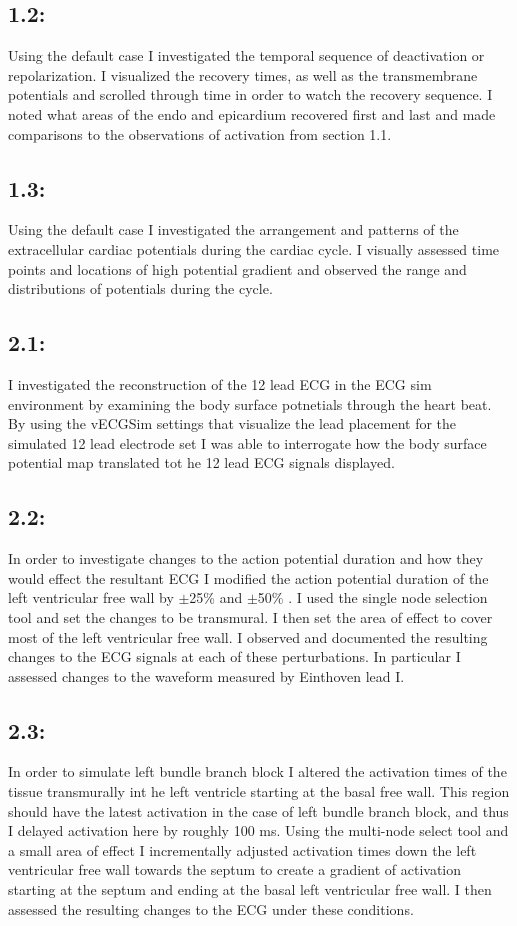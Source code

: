 \documentclass[12pt]{article}
\begin{document}
\subsection{1.2: }
Using the default case I investigated the temporal sequence of deactivation or repolarization. I visualized the recovery times, as well as the transmembrane potentials and scrolled through time in order to watch the recovery sequence. I noted what areas of the endo and epicardium recovered first and last and made comparisons to the observations of activation from section 1.1.
\subsection{1.3: }
Using the default case I investigated the arrangement and patterns of the extracellular cardiac potentials during the cardiac cycle. I visually assessed time points and locations of high potential gradient and observed the range and distributions of potentials during the cycle.

\subsection{2.1: }
I investigated the reconstruction of the 12 lead ECG in the ECG sim environment by examining the body surface potnetials through the heart beat. By using the vECGSim settings that visualize the lead placement for the simulated 12 lead electrode set I was able to interrogate how the body surface potential map translated tot he 12 lead ECG signals displayed.

\subsection{2.2: }
 In order to investigate changes to the action potential duration and how they would effect the resultant ECG I modified the action potential duration of the left ventricular free wall by $\pm$25\% and $\pm$50\% . I used the single node selection tool and set the changes to be transmural. I then set the area of effect to cover most of the left ventricular free wall. I observed and documented the resulting changes to the ECG signals at each of these perturbations. In particular I assessed changes to the waveform measured by Einthoven lead I. 
 
 \subsection{2.3: }
 In order to simulate left bundle branch block I altered the activation times of the tissue transmurally int he left ventricle starting at the basal free wall. This region should have the latest activation in the case of left bundle branch block, and thus I delayed activation here by roughly 100 ms. Using the multi-node select tool and a small area of effect I incrementally adjusted activation times down the left ventricular free wall towards the septum to create a gradient of activation starting at the septum and ending at the basal left ventricular free wall. I then assessed the resulting changes to the ECG under these conditions.
 
\end{document}
